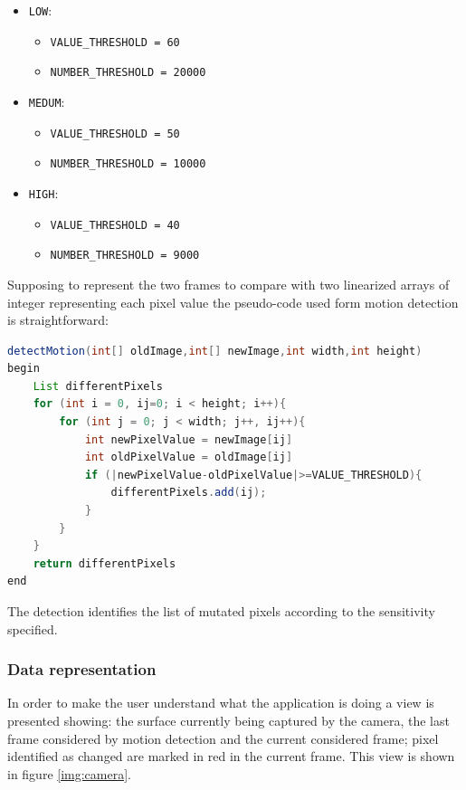 \documentclass[conference, 11pt]{IEEEtran}
\begin{document}
\begin{itemize}
	\item \texttt{LOW}:
		\begin{itemize}
		\item \texttt{VALUE\_THRESHOLD = 60}
		\item \texttt{NUMBER\_THRESHOLD = 20000}
		\end{itemize}
	\item \texttt{MEDUM}:
		\begin{itemize}
		\item \texttt{VALUE\_THRESHOLD = 50}
		\item \texttt{NUMBER\_THRESHOLD = 10000}
		\end{itemize}
	\item \texttt{HIGH}:
		\begin{itemize}
		\item \texttt{VALUE\_THRESHOLD = 40}
		\item \texttt{NUMBER\_THRESHOLD = 9000}
		\end{itemize}
\end{itemize}

Supposing to represent the two frames to compare with two linearized arrays of integer representing each pixel value the pseudo-code used form motion detection is straightforward:

\begin{lstlisting}[language=Java, caption=Pseudocode for motion detection]
detectMotion(int[] oldImage,int[] newImage,int width,int height)
begin
	List differentPixels
	for (int i = 0, ij=0; i < height; i++){
		for (int j = 0; j < width; j++, ij++){
			int newPixelValue = newImage[ij]
			int oldPixelValue = oldImage[ij]
			if (|newPixelValue-oldPixelValue|>=VALUE_THRESHOLD){
	            differentPixels.add(ij);
			}
		}
	}
	return differentPixels		
end
\end{lstlisting}

The detection identifies the list of mutated pixels according to the sensitivity specified.\\

\subsubsection{\textbf{Data representation}}
In order to make the user understand what the application is doing a view is presented showing: the surface currently being captured by the camera, the last frame considered by motion detection and the current considered frame; pixel identified as changed are marked in red in the current frame. This view is shown in figure \ref{img:camera}.\\
\end{document}
